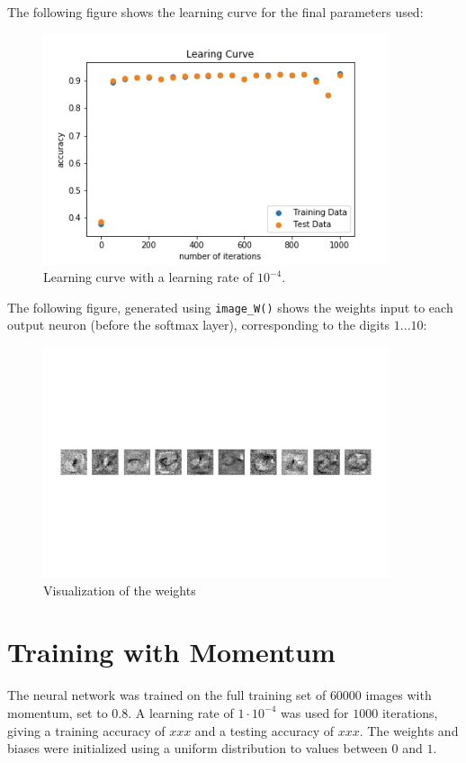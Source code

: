\documentclass{article}
\begin{document}
   The following figure shows the learning curve for the final parameters used:
     \begin{figure}[H] \centering
         \includegraphics[width=4in]{resources/part4}
         \caption{Learning curve with a learning rate of $10^{-4}$. }
      \end{figure}

  The following figure, generated using \texttt{image\_W()} shows the weights input to each
  output neuron (before the softmax layer), corresponding to the digits $1...10$:
     \begin{figure}[H] \centering
         \includegraphics[width=4in]{resources/weights}
         \caption{Visualization of the weights }
      \end{figure}





   \section{Training with Momentum}
   The neural network was trained on the full training set of $60000$ images with momentum, set to $0.8$.
   A learning rate of $1 \cdot 10^{-4}$ was used for $1000$ iterations, giving a training accuracy of $xxx$
   and a testing accuracy of $xxx$.
   The weights and biases were initialized using a uniform distribution to values between $0$ and $1$.
\end{document}
